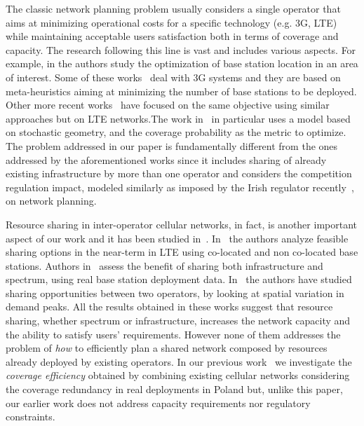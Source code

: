 \documentclass[10pt,journal,cspaper,compsoc]{IEEEtran}
\begin{document}
The classic network planning problem usually considers a single operator that aims at minimizing 
operational costs for a specific technology (e.g. 3G, LTE)
while maintaining acceptable users satisfaction both in terms of coverage and capacity.
The research following this line is vast and includes various aspects. For example, in 
\cite{amaldi2003,lee2000,khalek2011,shangyun2010,gordejuela2009,guo2013,ghazzai2015} the authors study the 
optimization of base station location in an area of interest.
Some of these works~\cite{amaldi2003,lee2000,khalek2011,shangyun2010} deal with 3G systems and they
are based on meta-heuristics aiming at minimizing the number of base stations to be deployed. Other 
more recent works~\cite{gordejuela2009,guo2013,ghazzai2015} have focused on the same objective using similar 
approaches but on LTE networks.The work in~\cite{guo2013} in particular uses a model based on stochastic geometry, 
and the coverage probability as the metric to optimize.
The problem addressed in our paper is fundamentally different from the ones addressed by the aforementioned works 
since it includes sharing of already existing infrastructure by more than one operator and considers 
the competition regulation impact, modeled similarly as imposed by the Irish regulator recently~\cite{vodafone-merger}, on network planning.

Resource sharing in inter-operator cellular networks, in fact, is another important aspect of our work and it has been studied in~\cite{panchal2013,hua2012,difrancesco2014,kibilda2013}.
In~\cite{panchal2013} the authors analyze feasible sharing options in the near-term in LTE using co-located and non co-located base stations.
Authors in~\cite{hua2012} assess the benefit of sharing both infrastructure and spectrum, using real base station deployment data.
In~\cite{difrancesco2014} the authors have studied sharing opportunities between two operators, by looking at 
spatial variation in demand peaks.
All the results obtained in these works suggest that resource sharing, whether spectrum or infrastructure,
increases the network capacity and the ability to satisfy users' requirements.
However none of them addresses the problem of \emph{how} to efficiently plan a shared network composed 
by resources already deployed by existing operators.
In our previous work~\cite{kibilda2013} we investigate the \emph{coverage efficiency} obtained by combining 
existing cellular networks considering the coverage redundancy in real deployments in Poland but, unlike this 
paper, our earlier work does not address capacity requirements nor regulatory constraints.
\end{document}
